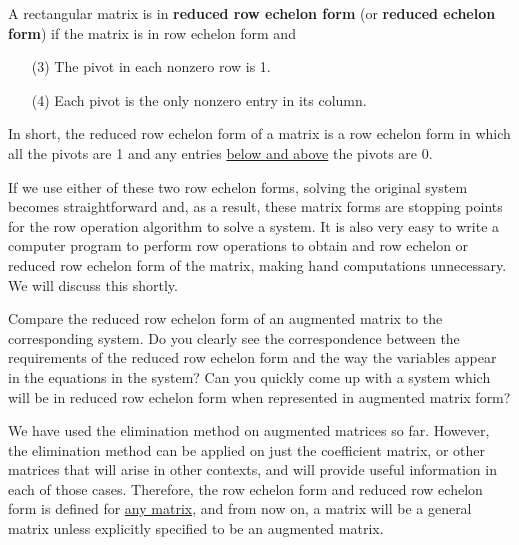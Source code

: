 \begin{definition} A rectangular matrix is in \textbf{reduced row echelon form} (or \textbf{reduced echelon form}) if the matrix is in row echelon form and 
        \begin{enumerate}
        \item[(3)] The pivot in each nonzero row is 1.
        \item[(4)] Each pivot is the only nonzero entry in its column.
        \end{enumerate}
\end{definition}



In short, the reduced row echelon form of a matrix is a row echelon form in which all the pivots are 1 and any entries \underline{below and above} the pivots are 0.

If we use either of these two row echelon forms, solving the original system becomes straightforward and, as a result, these matrix forms are stopping points for the row operation algorithm to solve a system. It is also very easy to write a computer program to perform row operations to obtain and row echelon or reduced row echelon form of the matrix, making hand computations unnecessary. We will discuss this shortly. 
 
\begin{reflect}Compare the reduced row echelon form of an augmented matrix to the corresponding system. Do you clearly see the correspondence between the requirements of the reduced row echelon form and the way the variables appear in the equations in the system? Can you quickly come up with a system which will be in reduced row echelon form when represented in augmented matrix form?
\end{reflect}



\begin{note} We have used the elimination method on augmented matrices so far. However, the elimination method can be applied on just the coefficient matrix, or other matrices that will arise in other contexts, and will provide useful information in each of those cases. Therefore, the row echelon form and reduced row echelon form is defined for \underline{any matrix}, and from now on, a matrix will be a general matrix unless explicitly specified to be an augmented matrix.
\end{note} 




